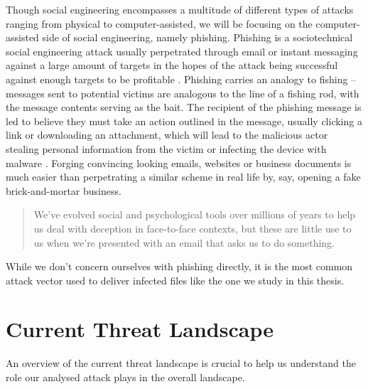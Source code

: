 Though social engineering encompasses a multitude of different types of attacks ranging from physical to
computer-assisted, we will be focusing on the computer-assisted side of social engineering, namely phishing. %
Phishing is a sociotechnical social engineering attack usually perpetrated through email or instant messaging 
against a large amount of targets in the hopes of the attack being successful against enough targets to be 
profitable \cite{advanced-social-engineering-attacks}. 
Phishing carries an analogy to fishing -- messages sent to potential victims are analogous to the line 
of a fishing rod, with the message contents serving as the bait. 
The recipient of the phishing message is led to believe they must take an action outlined in the message,
usually clicking a link or downloading an attachment, which will lead to the malicious actor stealing
personal information from the victim or infecting the device with malware \cite{state-of-phishing}.
Forging convincing looking emails, websites or business documents is much easier than perpetrating a similar 
scheme in real life by, say, opening a fake brick-and-mortar business.
\begin{quote}
  We’ve evolved social and psychological tools over millions of years to help
  us deal with deception in face-to-face contexts, but these are little use to us
  when we’re presented with an email that asks us to do something. \cite{anderson-security-engineering}
\end{quote}
While we don't concern ourselves with phishing directly, it is the most common attack vector used to deliver
infected files like the one we study in this thesis.  %

\section{Current Threat Landscape}
An overview of the current threat landscape is crucial to help us understand the role our analysed
attack plays in the overall landscape.

